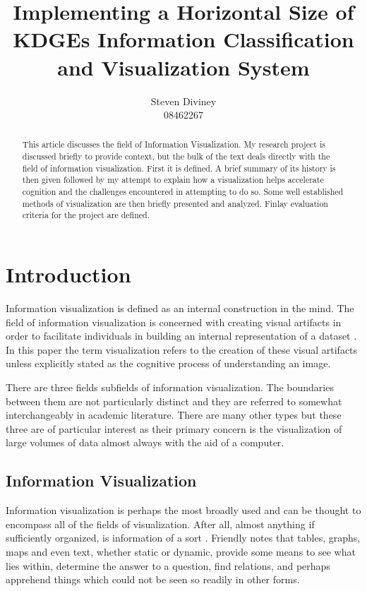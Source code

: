 \documentclass[a4paper, 10pt, titlepage, twocolumn, onehalfspace]{article}
\begin{document}
\title{Implementing a Horizontal Size of KDGEs Information Classification and Visualization System}
\author{Steven Diviney \\
08462267
}


\maketitle

\newpage

\begin{abstract}
This article discusses the field of Information Visualization. My research project is discussed briefly to provide context, but the bulk of the text deals directly with the field of information visualization. First it is defined. A brief summary of its history is then given followed by my attempt to explain how a visualization helps accelerate cognition and the challenges encountered in attempting to do so. Some well established methods of visualization are then briefly presented and analyzed. Finlay evaluation criteria for the project are defined. 
\end{abstract}


\section{Introduction}
Information visualization is defined as an internal construction in the mind. The field of information visualization is concerned with creating visual artifacts in order to facilitate individuals in building an internal representation of a dataset \cite{spence2001information}. In this paper the term visualization refers to the creation of these visual artifacts unless explicitly stated as the cognitive process of understanding an image.

There are three fields subfields of information visualization. The boundaries between them are not particularly distinct and they are referred to somewhat interchangeably in academic literature. There are many other types but these three are of particular interest as their primary concern is the visualization of large volumes of data almost always with the aid of a computer.
\subsection{Information Visualization}
Information visualization is perhaps the most broadly used and can be thought to encompass all of the fields of visualization. After all, almost anything if sufficiently organized, is information of a sort \cite{friendly2001milestones}. Friendly notes that tables, graphs, maps and even text, whether static or dynamic, provide some means to see what lies within, determine the answer to a question, find relations, and perhaps apprehend things which could not be seen so readily in other forms. 
\end{document}
